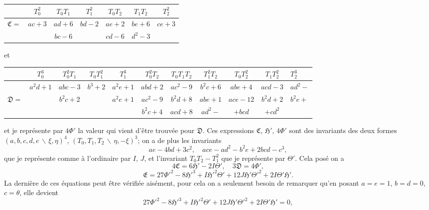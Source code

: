 \documentclass[11pt,a4paper]{article}
\theoremstyle{definition}
\begin{document}
\begin{center}
\renewcommand{\arraystretch}{1.3}
\begin{tabular}{|c|c|c|c|c|c|c|}
\hline
& $T_{0}^{2}$ & $T_{0}T_{1}$ & $T_{1}^{2}$ & $T_{0}T_{2}$ & $T_{1}T_{2}$ & $T_{2}^{2}$ \\
\hline
$\mathfrak{C}=$ & $ac+3$ & $ad+6$ & $bd-2$ & $ae+2$ & $be+6$ & $ce+3$ \\
& & $bc-6$ & & $cd-6$ & $d^{2}-3$ & \\
\hline
\end{tabular}
\end{center}

et

\begin{center}
\renewcommand{\arraystretch}{1.3}
\begin{tabular}{|c|c|c|c|c|c|c|c|c|c|}
\hline
& $T_{0}^{3}$ & $T_{0}^{2}T_{1}$ & $T_{0}T_{1}^{2}$ & $T_{1}^{3}$ & $T_{0}^{2}T_{2}$ & $T_{0}T_{1}T_{2}$ & $T_{1}^{2}T_{2}$ & $T_{0}T_{2}^{2}$ & $T_{1}T_{2}^{2}$ & $T_{2}^{3}$ \\
\hline
& $a^{2}d+1$ & $abc-3$ & $b^{3}+2$ & $a^{2}e+1$ & $abd+2$ & $ac^{2}-9$ & $b^{2}c+6$ & $abe+4$ & $acd-3$ & $ad^{2}-$ \\
$\mathfrak{D}=$ & & $b^{2}c+2$ & & $a^{2}e+1$ & $ac^{2}-9$ & $b^{2}d+8$ & $abe+1$ & $ace-12$ & $b^{2}d+2$ & $b^{2}e+$ \\
& & & & & $b^{2}c+4$ & $acd+8$ & $ad^{2}-$ & $+bcd$ & $+cd^{2}$ & \\
\hline
\end{tabular}
\end{center}

\newpage

et je repr\'{e}sente par $4\Phi'$ la valeur qui vient d'\^{e}tre trouv\'{e}e pour $\mathfrak{D}$.
Ces expressions $\mathfrak{C}$, $\mathfrak{H}'$, $4\Phi'$ sont des invariants des deux formes
$(a,b,c,d,e\,\backslash\!\!\,\xi,\eta)^{4}$, $(T_{0},T_{1},T_{2}\,\backslash\!\!\,\eta,-\xi)^{3}$;
on a de plus les invariants
\[ae-4bd+3c^{2}, \quad ace-ad^{2}-b^{2}e+2bcd-c^{3},\]
que je repr\'{e}sente comme \`{a} l'ordinaire par $I$, $J$, et l'invariant $T_{0}T_{2}-T_{1}^{2}$
que je repr\'{e}sente par $\Theta'$. Cela pos\'{e} on a
\[4\mathfrak{C} = 6\mathfrak{H}' - 2I\Theta', \quad 3\mathfrak{D} = 4\Phi',\]
\[\mathfrak{E} = 27\Phi'^{2} - 8\mathfrak{H}'^{3} + I\mathfrak{H}'^{2}\Theta' + 12J\mathfrak{H}'\Theta'^{2} + 2I\Theta'\mathfrak{H}'.\]
La derni\`{e}re de ces \'{e}quations peut \^{e}tre v\'{e}rifi\'{e}e ais\'{e}ment, pour cela on a seulement
besoin de remarquer qu'en posant $a=e=1$, $b=d=0$, $c=\theta$, elle devient
\[27\Phi'^{2} - 8\mathfrak{H}'^{3} + I\mathfrak{H}'^{2}\Theta' + 12J\mathfrak{H}'\Theta'^{2} + 2I\Theta'\mathfrak{H}' = 0,\]
\end{document}
